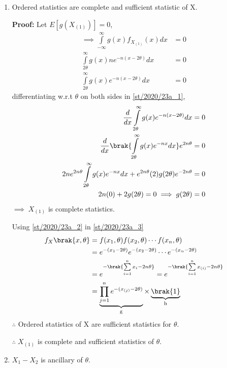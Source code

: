 \begin{enumerate}
    \item Ordered statistics are complete and sufficient statistic of X.
    
    \textbf{Proof:} 
    Let $E[g(X_{(1)})]=0$,
    \begin{align}
        \implies\int\limits_{-\infty}^{\infty} g(x) f_{X_{(1)}}(x) dx&=0\\
        \int\limits_{2\theta}^{\infty} g(x) n e^{-n(x-2\theta)} dx &=0\\
        \int\limits_{2\theta}^{\infty} g(x) e^{-n(x-2\theta)} dx &=0\label{st/2020/23a_1}
    \end{align}
    differentiating w.r.t $\theta$ on both sides in \eqref{st/2020/23a_1},
    \begin{align}
      \nonumber  \dfrac{d}{dx} \int\limits_{2\theta}^{\infty} g(x) e^{-n(x-2\theta)} dx =0\\
     \nonumber   \dfrac{d}{dx} \brak{\int\limits_{2\theta}^{\infty} g(x) e^{-nx} dx} e^{2n\theta} =0\\
     \nonumber   2n e^{2n\theta}\int\limits_{2\theta}^{\infty} g(x) e^{-nx} dx+e^{2n\theta}(2)g(2\theta)e^{-2n\theta}=0\\
     \nonumber2n(0)+2g(2\theta)=0\implies g(2\theta)=0
    \end{align}
    $\implies\;X_{(1)}$ is complete statistics.
    
    Using \eqref{st/2020/23a_2} in \eqref{st/2020/23a_3}
    \begin{align}
        f_X\brak{x,\theta}&=f(x_1,\theta)f(x_2,\theta)\cdots f(x_n,\theta)\\
        &=e^{-(x_1-2\theta)}e^{-(x_2-2\theta)}\cdots e^{-(x_n-2\theta)}\\
        &=e^{-\brak{\sum\limits_{i=1}^n x_i-2n\theta}}=e^{-\brak{\sum\limits_{i=1}^n x_{(i)}-2n\theta}}\label{st/2020/23a_3}\\
        &=\underbrace{ \prod\limits_{j=1}^n e^{-(x_{(j)}-2\theta)}}_\text{g}\times\underbrace{\brak{1}}_\text{h}
    \end{align}
    $\therefore$ Ordered statistics of X are sufficient statistics for $\theta$.
    
    $\therefore\;X_{(1)}$ is complete and sufficient statistics of $\theta$. 
    \item $X_1-X_2$ is ancillary of $\theta$.
    

\end{enumerate}
